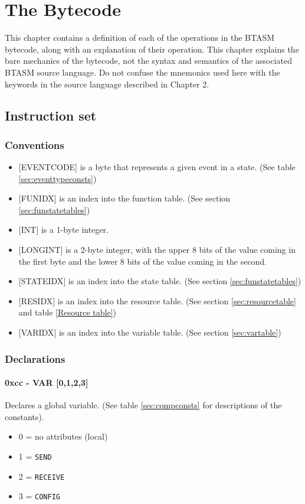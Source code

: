 \documentclass[12pt,a4paper]{scrbook}
\begin{document}
\chapter{The Bytecode}
This chapter contains a definition of each of the operations in the BTASM bytecode, along with an
explanation of their operation.  This chapter explains the bare mechanics of the bytecode, not
the syntax and semantics of the associated BTASM source language.  Do not confuse the mnemonics
used here with the keywords in the source language described in Chapter 2.

\section{Instruction set}

\subsection{Conventions}
\begin{itemize}
\item $[$EVENTCODE$]$ is a byte that represents a given event in a state. (See 
		table \ref{sec:eventtypeconsts})
\item $[$FUNIDX$]$ is an index into the function table. (See section \ref{sec:funstatetables})
\item $[$INT$]$ is a 1-byte integer.  
\item $[$LONGINT$]$ is a 2-byte integer, with the upper 8 bits of the value coming in the first byte 
		and the lower 8 bits of the value coming in the second.
\item $[$STATEIDX$]$ is an index into the state table. (See section \ref{sec:funstatetables})
\item $[$RESIDX$]$ is an index into the resource table. (See section \ref{sec:resourcetable} and 
		table \ref{Resource table})
\item $[$VARIDX$]$ is an index into the variable table. (See section \ref{sec:vartable})
\end{itemize}



\subsection{Declarations}

\subsubsection{0xcc - VAR [0,1,2,3]} 
Declares a global variable.  (See table \ref{sec:compconsts} for descriptions of the constants).
\begin{itemize}
\item 0 = no attributes (local)
\item 1 = \texttt{SEND}
\item 2 = \texttt{RECEIVE}
\item 3 = \texttt{CONFIG}
\end{itemize}
\end{document}
